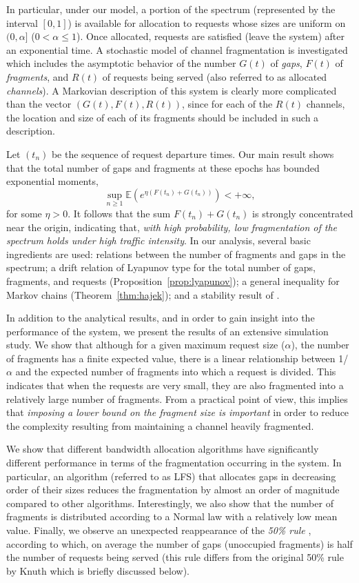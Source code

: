 \documentclass{amsart}
\def\E{\mathbb{E}}
\begin{document}
In particular, under our model, a portion  of the  spectrum (represented by the interval  $[0,1]$) is
available  for  allocation to  requests whose  sizes are uniform on  $(0,\alpha]$ ($0 < \alpha \leq 1$).  Once  allocated, requests are satisfied (leave the system) after an  exponential time. A stochastic model  of channel fragmentation
is investigated which includes the asymptotic
behavior of the number  $G(t)$ of \emph{gaps}, $F(t)$ of  \emph{fragments}, and $R(t)$ of requests being served (also referred to as allocated \emph{channels}). A
Markovian description of  this system is clearly more complicated  than the vector $(G(t),
F(t),  R(t))$, since for  each of  the $R(t)$  channels, the  location and  size of  each  of its
fragments should be included in such a description.

Let $(t_n)$ be the  sequence of  request departure times. Our main result shows that the total  number of gaps and fragments
at these epochs has bounded exponential moments,
\[
\sup_{n\geq 1}\E\left(e^{\eta(F(t_n)+G(t_n))}\right)<+\infty,
\]
for some $\eta>0$. It follows that the sum $F(t_n)+G(t_n)$ is strongly concentrated near the origin,
indicating that, \emph{with high probability, low fragmentation of the spectrum holds under high traffic intensity}.
In our  analysis, several basic ingredients  are used: relations between  the number of
fragments and gaps in the spectrum; a drift relation of Lyapunov type for
the total number of gaps, fragments, and requests (Proposition~\ref{prop:lyapunov});
a general inequality for Markov chains (Theorem~\ref{thm:hajek});
and a  stability result of \cite{KipnisR1990}.

In addition to the analytical results, and in order to gain insight into the performance of the system, we present the results of an extensive simulation study. We show that although for a given maximum request size ($\alpha$), the number of fragments has a finite expected value, there is a linear relationship between 1/$\alpha$ and the expected number of fragments into which a request is divided. This indicates that when the requests are very small, they are also fragmented into a relatively large number of fragments. From a practical point of view, this implies that \emph{imposing a lower bound on the fragment size is important} in order to reduce the complexity resulting from maintaining a channel heavily fragmented.

We show that different bandwidth allocation algorithms have significantly different performance in terms of the fragmentation occurring in the system. In particular, an algorithm (referred to as LFS) that allocates gaps in decreasing order of their sizes reduces the fragmentation by almost an order of magnitude compared to other algorithms. Interestingly, we also
show that the number of fragments is distributed according to a
Normal law with a relatively low mean value. Finally, we observe an
unexpected reappearance of the {\em 50\% rule} \cite{Knuth1997},
according to which, on average the number of gaps (unoccupied
fragments) is half the number of requests being served (this
rule differs from the original 50\% rule by Knuth
\cite{Knuth1997} which is briefly discussed below).
\end{document}
